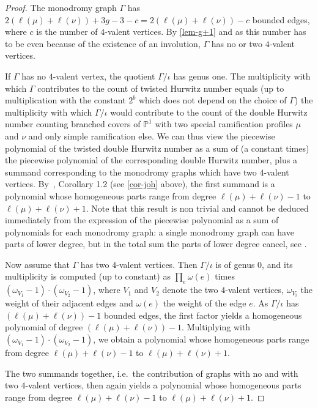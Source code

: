 \begin{proof}
 The monodromy graph $\Gamma$ has $2(\ell(\mu)+\ell(\nu))+3g-3-c=2(\ell(\mu)+\ell(\nu))-c$ bounded edges, where $c$ is the number of $4$-valent vertices. By \cref{lem-g+1} and as this number has to be even because of the existence of an involution, $\Gamma$ has no or two $4$-valent vertices.
 
 If $\Gamma$ has no $4$-valent vertex, the quotient $\Gamma/\iota$
 has genus one. The multiplicity with which $\Gamma$ contributes to the count of twisted Hurwitz number equals (up to multiplication with the constant $2^{b}$ which does not depend on the choice of $\Gamma$) the multiplicity with which $\Gamma/\iota$ would contribute to the count of the double Hurwitz number counting branched covers of $\mathbb{P}^1$ with two special ramification profiles $\mu$ and $\nu$ and only simple ramification else. 
 We can thus view the piecewise polynomial of the twisted double Hurwitz number as a sum of (a constant times) the piecewise polynomial of the corresponding double Hurwitz number, plus a summand corresponding to the monodromy graphs which have two $4$-valent vertices. 
 By~\cite{Joh15}, Corollary 1.2 (see \cref{cor-joh} above), the first summand is a polynomial whose homogeneous parts range from degree $\ell(\mu)+\ell(\nu)-1$ to $\ell(\mu)+\ell(\nu)+1$.
 Note that this result is non trivial and cannot be deduced immediately from the expression of the piecewise polynomial as a sum of polynomials for each monodromy graph: a single monodromy graph can have parts of lower degree, but in the total sum the parts of lower degree cancel, see \cite[Example~3.12]{CJM11}.
 
  Now assume that $\Gamma$ has two $4$-valent vertices. 
 Then $\Gamma/\iota$ is of genus $0$, and its multiplicity is computed (up to constant) as $\prod_e \omega(e)$ times $(\omega_{V_1}-1)\cdot (\omega_{V_2}-1)$, where $V_1$ and $V_2$ denote the two $4$-valent vertices, $\omega_{V_i}$ the weight of their adjacent edges and $\omega(e)$ the weight of the edge $e$.
 As $\Gamma/\iota$ has $(\ell(\mu)+\ell(\nu))-1$ bounded edges, the first factor yields a homogeneous polynomial of degree $(\ell(\mu)+\ell(\nu))-1$. Multiplying with $(\omega_{V_1}-1)\cdot (\omega_{V_2}-1)$, we obtain a polynomial whose homogeneous parts range from degree $\ell(\mu)+\ell(\nu)-1$ to $\ell(\mu)+\ell(\nu)+1$.
 
 The two summands together, i.e.\ the contribution of graphs with no and with two $4$-valent vertices, then again yields a polynomial whose homogeneous parts range from degree $\ell(\mu)+\ell(\nu)-1$ to $\ell(\mu)+\ell(\nu)+1$.
\end{proof}


